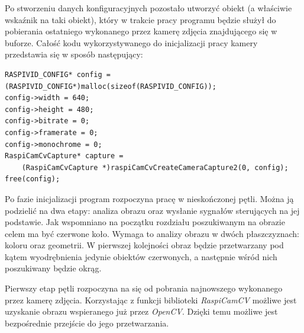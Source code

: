Po stworzeniu danych konfiguracyjnych pozostało utworzyć obiekt (a właściwie wskaźnik na taki obiekt), który w trakcie pracy programu będzie służył do pobierania ostatniego wykonanego przez kamerę zdjęcia znajdującego się w buforze. Całość kodu wykorzystywanego do inicjalizacji pracy kamery przedstawia się w sposób następujący:
\begin{lstlisting}[caption=Inicjalizacja pracy kamery]
RASPIVID_CONFIG* config = (RASPIVID_CONFIG*)malloc(sizeof(RASPIVID_CONFIG));
config->width = 640;
config->height = 480;
config->bitrate = 0;
config->framerate = 0;
config->monochrome = 0;
RaspiCamCvCapture* capture =
	(RaspiCamCvCapture *)raspiCamCvCreateCameraCapture2(0, config);
free(config); 
\end{lstlisting}

Po fazie inicjalizacji program rozpoczyna pracę w nieskończonej pętli. Można ją podzielić na dwa etapy: analiza obrazu oraz wysłanie sygnałów sterujących na jej podstawie. Jak wspomniano na początku rozdziału poszukiwanym na obrazie celem ma być czerwone koło. Wymaga to analizy obrazu w dwóch płaszczyznach: koloru oraz geometrii. W pierwszej kolejności obraz będzie przetwarzany pod kątem wyodrębnienia jedynie obiektów czerwonych, a następnie wśród nich poszukiwany będzie okrąg.

Pierwszy etap pętli rozpoczyna na się od pobrania najnowszego wykonanego przez kamerę zdjęcia. Korzystając z funkcji biblioteki \textit{RaspiCamCV} możliwe jest uzyskanie obrazu wspieranego już przez \textit{OpenCV}. Dzięki temu możliwe jest bezpośrednie przejście do jego przetwarzania.

